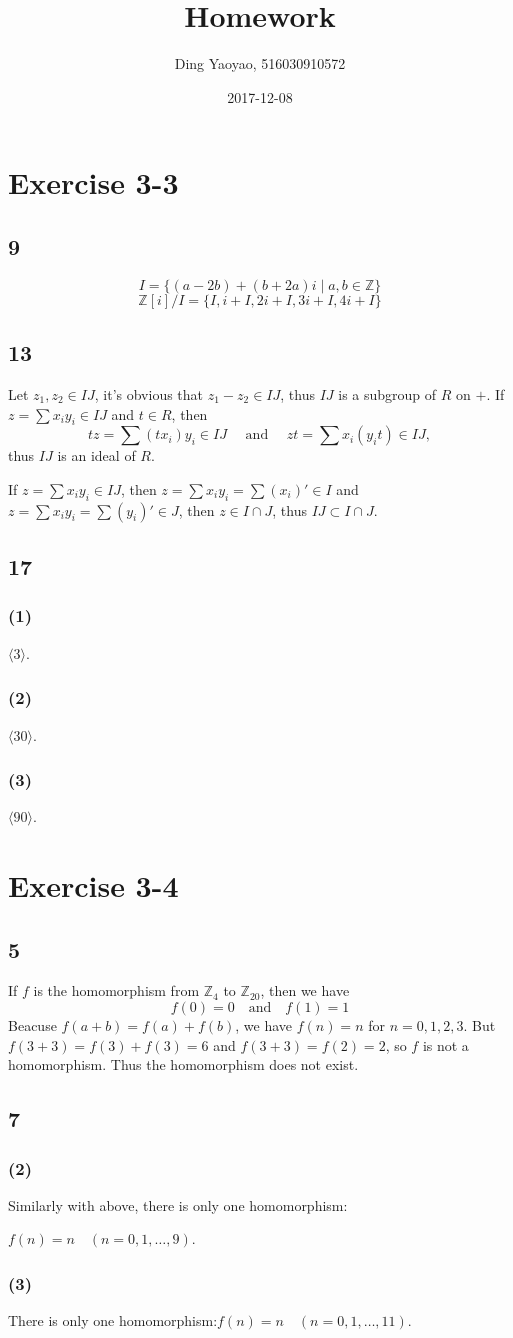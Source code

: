 \documentclass[draft]{article}
\title{Homework}
\date{2017-12-08}
\author{Ding Yaoyao, 516030910572}
\begin{document}
	\maketitle
	\section*{Exercise 3-3}
		\subsection*{9}
			$$
				I = \{ (a-2b) + (b+2a)i \mid a, b \in \mathbb{Z} \}
			$$
			$$
				\mathbb{Z}[i]/I = \{ I, i+I, 2i+I, 3i+I, 4i+I \}
			$$
		\subsection*{13}
			Let $z_1, z_2 \in IJ$, it's obvious that $z_1 - z_2 \in IJ$, thus $IJ$ is a
			subgroup of $R$ on $+$. If $z = \sum x_iy_i \in IJ$ and $t \in R$, then 
			$$
			tz = \sum (tx_i)y_i \in IJ \quad \text{ and } \quad zt = \sum x_i(y_it) \in IJ,
			$$
			thus $IJ$ is an ideal of $R$.

			If $z = \sum x_iy_i \in IJ$, then $z = \sum x_iy_i = \sum (x_i)' \in I$
			and $z = \sum x_iy_i = \sum (y_i)' \in J$, then $z \in I\cap J$, thus $IJ
			\subset I \cap J$.
		\subsection*{17}
			\subsubsection*{(1)}
				$\langle 3 \rangle$.
			\subsubsection*{(2)}
				$\langle 30 \rangle$.
			\subsubsection*{(3)}
				$\langle 90 \rangle$.
	\section*{Exercise 3-4}
		\subsection*{5}
			If $f$ is the homomorphism from $\mathbb{Z}_4$ to $\mathbb{Z}_{20}$, then
			we have 
			$$
			f(0) = 0 \quad \text{and} \quad f(1) = 1
			$$
			Beacuse $f(a+b) = f(a) + f(b)$, we have $f(n) = n$ for $n = 0, 1, 2, 3$.
			But $f(3+3) = f(3) + f(3) = 6$ and $f(3+3) = f(2) = 2$, so $f$ is not a
			homomorphism. Thus the homomorphism does not exist.

		\subsection*{7}
			\subsubsection*{(2)}
				Similarly with above, there is only one homomorphism:
				
				$f(n) = n \quad (n = 0, 1, \dots, 9)$.
			\subsubsection*{(3)}
				There is only one homomorphism:$f(n) = n \quad (n = 0, 1, \dots, 11)$.
\end{document}
